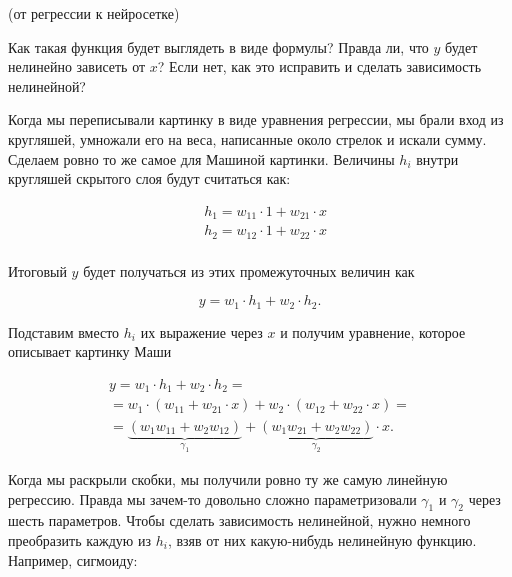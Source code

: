 \begin{problem}{(от регрессии к нейросетке)}
\begin{center}
\end{center}

Как такая функция будет выглядеть в виде формулы? Правда ли, что $y$ будет нелинейно зависеть от $x$? Если нет, как это исправить и сделать зависимость нелинейной? 
\end{problem}

\newpage

\begin{sol}
Когда мы переписывали картинку в виде уравнения регрессии, мы брали вход из кругляшей, умножали его на веса, написанные около стрелок и искали сумму. Сделаем ровно то же самое для Машиной картинки. Величины $h_i$ внутри кругляшей скрытого слоя будут считаться как: 

\begin{equation*}
    \begin{aligned} 
    & h_1 = w_{11} \cdot 1 + w_{21} \cdot x \\
    & h_2 = w_{12} \cdot 1 + w_{22} \cdot x \\
    \end{aligned} 
\end{equation*}

Итоговый $y$ будет получаться из этих промежуточных величин как 

$$
y = w_1 \cdot h_1 + w_2 \cdot h_2.
$$

Подставим вместо $h_i$ их выражение через $x$ и получим уравнение, которое описывает картинку Маши

\begin{multline*} 
y = w_1 \cdot h_1 + w_2 \cdot h_2 = \\ = w_1 \cdot (w_{11} + w_{21} \cdot x)  + w_2 \cdot (w_{12} + w_{22} \cdot x)  = \\ = \underbrace{(w_1 w_{11} + w_2 w_{12})}_{\gamma_1} + \underbrace{(w_1 w_{21} + w_2 w_{22})}_{\gamma_2} \cdot x.
\end{multline*} 

Когда мы раскрыли скобки, мы получили ровно ту же самую линейную регрессию. Правда мы зачем-то довольно сложно параметризовали $\gamma_1$ и $\gamma_2$ через шесть параметров. Чтобы сделать зависимость нелинейной, нужно немного преобразить каждую из $h_i$, взяв от них какую-нибудь нелинейную функцию. Например, сигмоиду: 


\end{sol}
